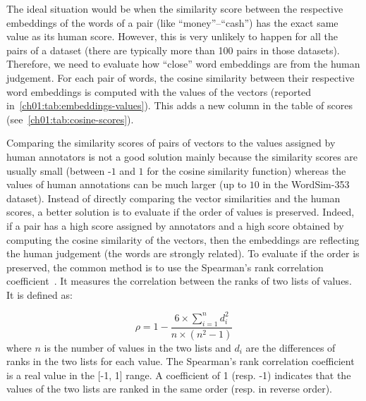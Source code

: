       \pagebreak %
      \noindent The ideal situation would be when the similarity score between
      the respective embeddings of the words of a pair (like
      ``money''--``cash'') has the exact same value as its human score.
      However, this is very unlikely to happen for all the pairs of a dataset
      (there are typically more than 100 pairs in those datasets). Therefore, we
      need to evaluate how ``close'' word embeddings are from the human
      judgement. For each pair of words, the cosine similarity between their
      respective word embeddings is computed with the values of the vectors
      (reported in~\autoref{ch01:tab:embeddings-values}). This adds a new
      column in the table of scores
      (see~\autoref{ch01:tab:cosine-scores}).\medskip

      Comparing the similarity scores of pairs of vectors to the values assigned
      by human annotators is not a good solution mainly because the similarity
      scores are usually small (between -$1$ and $1$ for the cosine similarity
      function) whereas the values of human annotations can be much larger (up
      to $10$ in the WordSim-353 dataset). Instead of directly comparing the
      vector similarities and the human scores, a better solution is to evaluate
      if the order of values is preserved. Indeed, if a pair has a high score
      assigned by annotators and a high score obtained by computing the cosine
      similarity of the vectors, then the embeddings are reflecting the human
      judgement (the words are strongly related). To evaluate if the order is
      preserved, the common method is to use the Spearman's rank correlation
      coefficient~\citep{spearman1904proof}. It measures the correlation between
      the ranks of two lists of values. It is defined as:

      \begin{equation}
        \label{ch01:eq:spearman-coefficient}
        \rho = 1 - \frac{6 \times \sum_{i = 1}^n d_i^2}
                                    {n \times (n^2 - 1)}
      \end{equation}
      where $n$ is the number of values in the two lists and $d_i$ are the
      differences of ranks in the two lists for each value. The Spearman's rank
      correlation coefficient is a real value in the [-1, 1] range. A coefficient of 1
      (resp. -1) indicates that the values of the two lists are ranked in the
      same order (resp. in reverse order). \medskip

